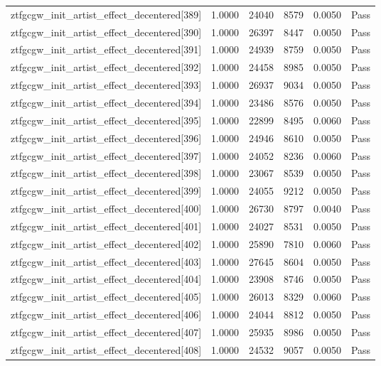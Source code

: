 \begin{table}[htbp]
\begin{tabular}{llrrll}
ztfgcgw\_init\_artist\_effect\_decentered[389] & 1.0000 & 24040 & 8579 & 0.0050 & Pass \\
ztfgcgw\_init\_artist\_effect\_decentered[390] & 1.0000 & 26397 & 8447 & 0.0050 & Pass \\
ztfgcgw\_init\_artist\_effect\_decentered[391] & 1.0000 & 24939 & 8759 & 0.0050 & Pass \\
ztfgcgw\_init\_artist\_effect\_decentered[392] & 1.0000 & 24458 & 8985 & 0.0050 & Pass \\
ztfgcgw\_init\_artist\_effect\_decentered[393] & 1.0000 & 26937 & 9034 & 0.0050 & Pass \\
ztfgcgw\_init\_artist\_effect\_decentered[394] & 1.0000 & 23486 & 8576 & 0.0050 & Pass \\
ztfgcgw\_init\_artist\_effect\_decentered[395] & 1.0000 & 22899 & 8495 & 0.0060 & Pass \\
ztfgcgw\_init\_artist\_effect\_decentered[396] & 1.0000 & 24946 & 8610 & 0.0050 & Pass \\
ztfgcgw\_init\_artist\_effect\_decentered[397] & 1.0000 & 24052 & 8236 & 0.0060 & Pass \\
ztfgcgw\_init\_artist\_effect\_decentered[398] & 1.0000 & 23067 & 8539 & 0.0050 & Pass \\
ztfgcgw\_init\_artist\_effect\_decentered[399] & 1.0000 & 24055 & 9212 & 0.0050 & Pass \\
ztfgcgw\_init\_artist\_effect\_decentered[400] & 1.0000 & 26730 & 8797 & 0.0040 & Pass \\
ztfgcgw\_init\_artist\_effect\_decentered[401] & 1.0000 & 24027 & 8531 & 0.0050 & Pass \\
ztfgcgw\_init\_artist\_effect\_decentered[402] & 1.0000 & 25890 & 7810 & 0.0060 & Pass \\
ztfgcgw\_init\_artist\_effect\_decentered[403] & 1.0000 & 27645 & 8604 & 0.0050 & Pass \\
ztfgcgw\_init\_artist\_effect\_decentered[404] & 1.0000 & 23908 & 8746 & 0.0050 & Pass \\
ztfgcgw\_init\_artist\_effect\_decentered[405] & 1.0000 & 26013 & 8329 & 0.0060 & Pass \\
ztfgcgw\_init\_artist\_effect\_decentered[406] & 1.0000 & 24044 & 8812 & 0.0050 & Pass \\
ztfgcgw\_init\_artist\_effect\_decentered[407] & 1.0000 & 25935 & 8986 & 0.0050 & Pass \\
ztfgcgw\_init\_artist\_effect\_decentered[408] & 1.0000 & 24532 & 9057 & 0.0050 & Pass \\

\end{tabular}
\end{table}
